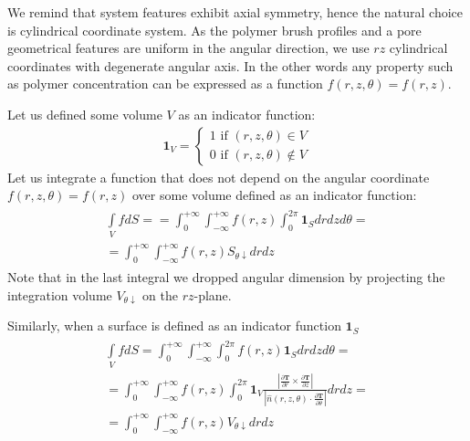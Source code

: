 \documentclass[10pt, a4paper]{article}
\begin{document}
\begin{multicols}{2}
We remind that system features exhibit axial symmetry, hence the natural choice is cylindrical coordinate system.
As the polymer brush profiles and a pore geometrical features are uniform in the angular direction, we use $rz$ cylindrical coordinates with degenerate angular axis. In the other words any property such as polymer concentration can be expressed as a function
$f(r,z, \theta) = f(r,z)$.

Let us defined some volume $V$ as an indicator function:
\begin{eqnarray}
    \bm{1}_V =
    \begin{cases}
        1 \textrm{ if } (r,z,\theta) \in V\\
        0 \textrm{ if } (r,z,\theta) \notin  V
    \end{cases}
\end{eqnarray}
Let us integrate a function that does not depend on the angular coordinate $f(r,z, \theta) = f(r,z)$ over some volume defined as an indicator function:
\begin{eqnarray}
    \begin{split}
        \int\limits_{V} f dS =
        =\int_{0}^{+\infty} \int_{-\infty}^{+\infty} f(r, z) \int_{0}^{2\pi}  \bm{1}_S dr dz d\theta =\\
        =\int_{0}^{+\infty} \int_{-\infty}^{+\infty} f(r, z)  S_{\theta \downarrow} dr dz
    \end{split}
\end{eqnarray}
Note that in the last integral we dropped angular dimension by projecting the integration volume $V_{\theta \downarrow}$ on the $rz$-plane.

Similarly, when a surface is defined as an indicator function $\bm{1}_S$
\begin{eqnarray}
    \begin{split}
        \int\limits_{V} f dS = \int_{0}^{+\infty} \int_{-\infty}^{+\infty} \int_{0}^{2\pi} f(r, z) \bm{1}_S  dr dz d\theta =\\
        =\int_{0}^{+\infty} \int_{-\infty}^{+\infty} f(r, z) \int_{0}^{2\pi}  \bm{1}_V  \frac{\left|\frac{\partial \bm{T}}{\partial r} \times \frac{\partial \bm{T}}{\partial z} \right|}{\left|\hat{n}(r, z, \theta) \cdot \frac{\partial\bm{T}}{\partial \theta}\right|} dr dz =\\
        =\int_{0}^{+\infty} \int_{-\infty}^{+\infty} f(r, z)  V_{\theta \downarrow} dr dz
    \end{split}
\end{eqnarray}


\end{multicols}
\end{document}
